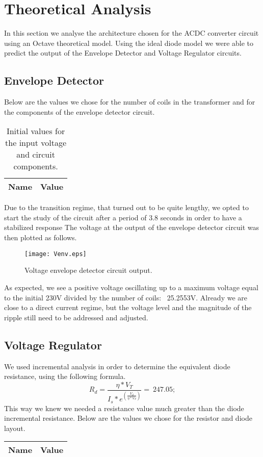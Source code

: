 \section{Theoretical Analysis}
\label{sec:analysis}

In this section we analyse the architecture chosen for the ACDC converter circuit using an Octave theoretical model. Using the ideal diode model we were able to predict the output of the Envelope Detector and Voltage Regulator circuits.

\subsection{Envelope Detector}
Below are the values we chose for the number of coils in the transformer and for the components of the envelope detector circuit.
\begin{table}[h]
  \centering
  \begin{tabular}{|l|r|}
    \hline    
    {\bf Name} & {\bf Value} \\ \hline
     
  \end{tabular}
  \caption{Initial values for the input voltage and circuit components.}
\end{table}
Due to the transition regime, that turned out to be quite lengthy, we opted to start the study of the circuit after a period of 3.8 seconds in order to have a stabilized response
The voltage at the output of the envelope detector circuit was then plotted as follows.
\begin{figure}[h] \centering
\texttt{[image: Venv.eps]}
\caption{Voltage envelope detector circuit output.}
\end{figure}
As expected, we see a positive voltage oscillating up to a maximum voltage equal to the initial 230V divided by the number of coils: ~25.2553V. Already we are close to a direct current regime, but the voltage level and the magnitude of the ripple still need to be addressed and adjusted.
\subsection{Voltage Regulator}
We used incremental analysis in order to determine the equivalent diode resistance, using the following formula.
\begin{equation}
R_d=\frac{\eta*V_T}{I_s*e^(\frac{V_d}{\eta*V_T})}=~247.05;
\end{equation}
This way we knew we needed a resistance value much greater than the diode incremental resistance. Below are the values we chose for the resistor and diode layout.
\begin{table}[h]
  \centering
  \begin{tabular}{|l|r|}
    \hline    
    {\bf Name} & {\bf Value} \\ \hline
     
  \end{tabular}
\end{table}

